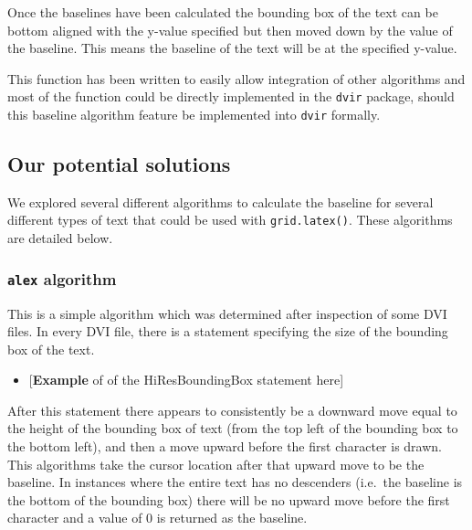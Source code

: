 \documentclass[]{article}
\newenvironment{Shaded}{\begin{snugshade}}{\end{snugshade}}
\newcommand{\KeywordTok}[1]{\textcolor[rgb]{0.13,0.29,0.53}{\textbf{#1}}}
\newcommand{\DataTypeTok}[1]{\textcolor[rgb]{0.13,0.29,0.53}{#1}}
\newcommand{\CharTok}[1]{\textcolor[rgb]{0.31,0.60,0.02}{#1}}
\newcommand{\StringTok}[1]{\textcolor[rgb]{0.31,0.60,0.02}{#1}}
\newcommand{\NormalTok}[1]{#1}
\providecommand{\tightlist}{%
  \setlength{\itemsep}{0pt}\setlength{\parskip}{0pt}}
\begin{document}
Once the baselines have been calculated the bounding box of the text can
be bottom aligned with the y-value specified but then moved down by the
value of the baseline. This means the baseline of the text will be at
the specified y-value.

This function has been written to easily allow integration of other
algorithms and most of the function could be directly implemented in the
\texttt{dvir} package, should this baseline algorithm feature be
implemented into \texttt{dvir} formally.

\subsection{Our potential solutions}\label{our-potential-solutions}

We explored several different algorithms to calculate the baseline for
several different types of text that could be used with
\texttt{grid.latex()}. These algorithms are detailed below.

\subsubsection{\texorpdfstring{\texttt{alex}
algorithm}{alex algorithm}}\label{alex-algorithm}

This is a simple algorithm which was determined after inspection of some
DVI files. In every DVI file, there is a statement specifying the size
of the bounding box of the text.

\begin{itemize}
\tightlist
\item
  {[}\textbf{Example} of of the HiResBoundingBox statement here{]}
\end{itemize}

After this statement there appears to consistently be a downward move
equal to the height of the bounding box of text (from the top left of
the bounding box to the bottom left), and then a move upward before the
first character is drawn. This algorithms take the cursor location after
that upward move to be the baseline. In instances where the entire text
has no descenders (i.e.~the baseline is the bottom of the bounding box)
there will be no upward move before the first character and a value of 0
is returned as the baseline.

\begin{Shaded}
\end{Shaded}
\end{document}
